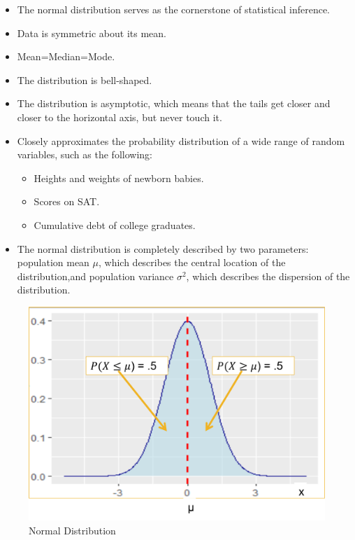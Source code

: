 \documentclass[
  letterpaper,
  DIV=11,
  numbers=noendperiod]{scrreprt}
\providecommand{\tightlist}{%
  \setlength{\itemsep}{0pt}\setlength{\parskip}{0pt}}\usepackage{longtable,booktabs,array}
\begin{document}
\begin{itemize}
\item
  The normal distribution serves as the cornerstone of statistical
  inference.
\item
  Data is symmetric about its mean.
\item
  Mean=Median=Mode.
\item
  The distribution is bell-shaped.
\item
  The distribution is asymptotic, which means that the tails get closer
  and closer to the horizontal axis, but never touch it.
\item
  Closely approximates the probability distribution of a wide range of
  random variables, such as the following:

  \begin{itemize}
  \tightlist
  \item
    Heights and weights of newborn babies.
  \item
    Scores on SAT.
  \item
    Cumulative debt of college graduates.
  \end{itemize}
\item
  The normal distribution is completely described by two parameters:
  population mean \(\mu\), which describes the central location of the
  distribution,and population variance \(\sigma^2\), which describes the
  dispersion of the distribution.
\end{itemize}

\begin{figure}[H]

{\centering \includegraphics{Pictures/Ch4/NormalDist.png}

}

\caption{Normal Distribution}

\end{figure}%
\end{document}
